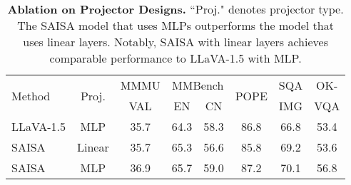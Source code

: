 \begin{table}[t]
  \centering
    \resizebox{\linewidth}{!}
    {
    \begin{tabular}{l|c|cccccc}
    \toprule
    \multirow{2}[2]{*}{Method} & \multirow{2}[2]{*}{Proj.} & MMMU & \multicolumn{2}{c}{MMBench} & \multirow{2}[2]{*}{POPE}  & SQA & OK-  \\
        &  & VAL  & EN & CN     &             & IMG & VQA \\
    \midrule
    LLaVA-1.5 & MLP & 35.7  & 64.3 & 58.3  & 86.8  & 66.8 & 53.4  \\
    SAISA & Linear & 35.7 & 65.3 & 56.6   & 85.8  & 69.2 & 53.6  \\
    \rowcolor{cyan!20} SAISA & MLP & 36.9 & 65.7 & 59.0 & 87.2  & 70.1 & 56.8  \\
    \bottomrule
    \end{tabular}
    }
    \caption{\textbf{Ablation on Projector Designs.} ``Proj." denotes projector type.
    The SAISA model that uses MLPs outperforms the model that uses linear layers.
    Notably, SAISA with linear layers achieves comparable performance to LLaVA-1.5 with MLP.
    }
  \label{tab:linear}
\end{table}
